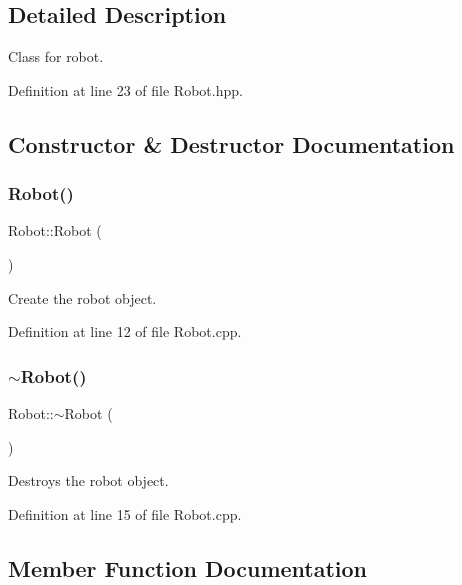 \subsection{Detailed Description}
Class for robot. 

Definition at line 23 of file Robot.\+hpp.



\subsection{Constructor \& Destructor Documentation}
\mbox{\label{class_robot_a4fc7c70ae20623f05e06f2ecb388b6c4}} 
\subsubsection{\texorpdfstring{Robot()}{Robot()}}
{\footnotesize\ttfamily Robot\+::\+Robot (\begin{DoxyParamCaption}{ }\end{DoxyParamCaption})}



Create the robot object. 



Definition at line 12 of file Robot.\+cpp.

\mbox{\label{class_robot_a924320124b09c2f2ac1621aa210d5f38}} 
\subsubsection{\texorpdfstring{$\sim$\+Robot()}{~Robot()}}
{\footnotesize\ttfamily Robot\+::$\sim$\+Robot (\begin{DoxyParamCaption}{ }\end{DoxyParamCaption})}



Destroys the robot object. 



Definition at line 15 of file Robot.\+cpp.



\subsection{Member Function Documentation}
\mbox{\label{class_robot_af43ba25439de328499e3d2f266e92592}} 

